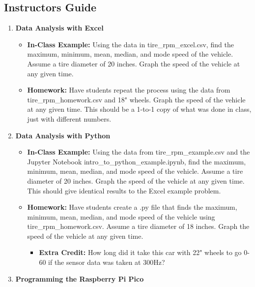 \subsection{Instructors Guide}
\begin{enumerate}
    \item \textbf{Data Analysis with Excel}
        \begin{itemize}
            \item \textbf{In-Class Example:} Using the data in 
            tire\_rpm\_excel.csv, find the maximum, minimum, 
            mean, median, and mode speed of the vehicle. Assume 
            a tire diameter of 20 inches. Graph the speed of 
            the vehicle at any given time.
            \item \textbf{Homework:} Have students repeat the 
            process using the data from tire\_rpm\_homework.csv 
            and 18" wheels. Graph the speed of the vehicle at 
            any given time. This should be a 1-to-1 copy of what 
            was done in class, just with different numbers.
        \end{itemize}
    \item \textbf{Data Analysis with Python}
        \begin{itemize}
            \item \textbf{In-Class Example:} Using the data from 
            tire\_rpm\_example.csv and the Jupyter Notebook 
            intro\_to\_python\_example.ipynb, find the maximum, 
            minimum, mean, median, and mode speed of the vehicle. 
            Assume a tire diameter of 20 inches. Graph the speed 
            of the vehicle at any given time. This should give 
            identical results to the Excel example problem.
            \item \textbf{Homework:} Have students create a .py 
            file that finds the maximum, minimum, mean, median, 
            and mode speed of the vehicle using 
            tire\_rpm\_homework.csv. Assume a tire diameter of 
            18 inches. Graph the speed of the vehicle at any 
            given time.
                \begin{itemize}
                    \item \textbf{Extra Credit:} How long did 
                    it take this car with 22" wheels to go 0-60 
                    if the sensor data was taken at 300Hz?
                \end{itemize}
        \end{itemize}
    \item \textbf{Programming the Raspberry Pi Pico}

\end{enumerate}
